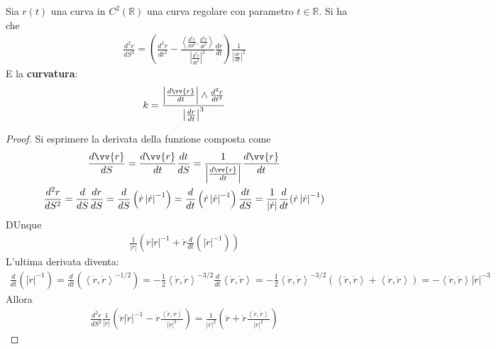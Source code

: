 \documentclass[a4paper, oneside]{article}
\begin{document}
\begin{theorem}
    Sia $r(t)$ una curva in $C^{2}(\mathbb{R})$ una curva regolare con parametro $t \in \mathbb{R}$. Si ha che
    \begin{gather*}
        \frac{d^{2}r}{dS^{2}} = \left(\frac{d^{2}r}{dt^{2}} - \frac{\left< \frac{d^{2}r}{dS^{2}}, \frac{d^{2}r}{dt^{2}} \right> }{\left| \frac{d^{2}r}{dt^{2}} \right|^{2} } \frac{dr}{dt}\right) \frac{1}{\left| \frac{dr}{dt} \right|^{2} }
    \end{gather*}
    E la \textbf{curvatura}:
    \begin{gather*}
        k = \frac{\left| \frac{d\vv{r} }{dt} \right| \wedge \frac{d^{2}r}{dt^{2}} }{\left| \frac{dr}{dt} \right|^{3} }
    \end{gather*}
\end{theorem}
\begin{proof}
    Si esprimere la derivata della funzione composta come
    \begin{gather*}
        \frac{d\vv{r} }{dS} = \frac{d\vv{r} }{dt} \frac{dt}{dS} = \frac{1}{\left|  \frac{d\vv{r} }{dt}\right| } \frac{d\vv{r} }{dt} \\
        \frac{d^{2}r}{dS^{2}} = \frac{d}{dS} \frac{dr}{dS} = \frac{d}{dS} \left(\dot{r} \left| \dot{r}  \right|^{-1}  \right) = \frac{d}{dt} \left(\dot{r} \left| \dot{r}  \right|^{-1}  \right) \frac{dt}{dS} = \frac{1}{\left| \dot{r}  \right| } \frac{d}{dt} (\dot{r} \left| \dot{r}  \right| ^{-1}  )
    \end{gather*}
    DUnque
    \begin{gather*}
        \frac{1}{\left| \dot{r}  \right| } \left(\ddot{r} \left| \dot{r}  \right| ^{-1} + \dot{r} \frac{d}{dt}(\left| \dot{r}  \right| ^{-1} )   \right)
    \end{gather*}
    L'ultima derivata diventa:
    \begin{gather*}
        \frac{d}{dt}(\left| \dot{r}  \right| ^{-1} ) = \frac{d}{dt} (\left< \dot{r}, \dot{r}   \right> ^{-1/2} ) = - \frac{1}{2} \left< \dot{r}, \dot{r}   \right>^{-3/2} \frac{d}{dt}\left< \dot{r}, \dot{r}   \right> = -\frac{1}{2}  \left< \dot{r}, \dot{r}   \right>^{-3/2} (\left< \ddot{r}, \dot{r}   \right> + \left< \dot{r}, \ddot{r }   \right>  ) = -\left< \dot{r}, \ddot{r}   \right> \left| \dot{r}  \right|^{-3} 
    \end{gather*}
    Allora 
    \begin{gather*}
        \frac{d^{2}r}{dS^{2}}\frac{1}{\left| \dot{r}  \right| } \left(\ddot{r} \left| \dot{r}  \right| ^{-1}  - \dot{r} \frac{\left< \dot{r}, \ddot{r}   \right> }{\left| \dot{r}  \right|^3 }  \right) = \frac{1}{\left| \dot{r}  \right|^2 } \left(\ddot{r} + \dot{r} \frac{\left< \dot{r}, \ddot{r}   \right> }{\left| \dot{r}  \right|^2 }  \right)

\end{gather*}
\end{proof}
\end{document}
